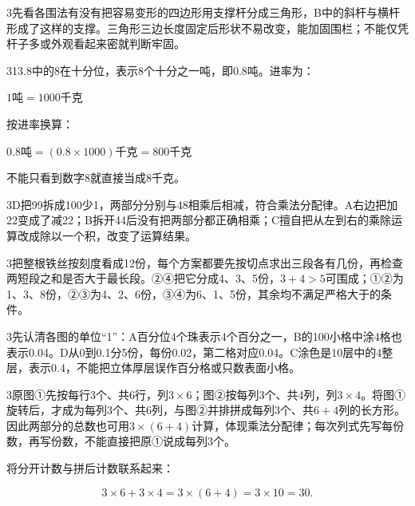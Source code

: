 \documentclass[multi=snippet,border={5bp 20bp 5bp 5bp}]{standalone}
\newenvironment{snippet}[3]{\begin{minipage}{#1bp}\color{answerred}\fontsize{#2}{#3}\selectfont\raggedright}{\end{minipage}}
\begin{document}
\begin{snippet}{505}{11.5}{14}\begin{multicols}{3}\raggedcolumns 先看各围法有没有把容易变形的四边形用支撑杆分成三角形，B中的斜杆与横杆形成了这样的支撑。三角形三边长度固定后形状不易改变，能加固围栏；不能仅凭杆子多或外观看起来密就判断牢固。\end{multicols}\end{snippet}
\begin{snippet}{505}{11.5}{14}\begin{multicols}{3}\raggedcolumns 13.8中的8在十分位，表示8个十分之一吨，即0.8吨。进率为：\par\noindent\(\displaystyle 1\text{吨}=1000\text{千克}\)\allowbreak \par 按进率换算：\par\noindent\(\displaystyle 0.8\text{吨}=(0.8\times1000)\text{千克}=800\text{千克}\)\allowbreak \par 不能只看到数字8就直接当成8千克。\end{multicols}\end{snippet}
\begin{snippet}{505}{11.5}{14}\begin{multicols}{3}\raggedcolumns D把99拆成100少1，两部分分别与48相乘后相减，符合乘法分配律。A右边把加22变成了减22；B拆开44后没有把两部分都正确相乘；C擅自把从左到右的乘除运算改成除以一个积，改变了运算结果。\end{multicols}\end{snippet}
\begin{snippet}{505}{11.5}{14}\begin{multicols}{3}\raggedcolumns 把整根铁丝按刻度看成12份，每个方案都要先按切点求出三段各有几份，再检查两短段之和是否大于最长段。②④把它分成4、3、5份，\(3+4>5\)\allowbreak 可围成；①②为1、3、8份，②③为4、2、6份，③④为6、1、5份，其余均不满足严格大于的条件。\end{multicols}\end{snippet}
\begin{snippet}{505}{11.5}{14}\begin{multicols}{3}\raggedcolumns 先认清各图的单位“1”：A百分位4个珠表示4个百分之一，B的100小格中涂4格也表示0.04。D从0到0.1分5份，每份0.02，第二格对应0.04。C涂色是10层中的4整层，表示0.4，不能把立体厚层误作百分格或只数表面小格。\end{multicols}\end{snippet}
\begin{snippet}{505}{11.5}{14}\begin{multicols}{3}\raggedcolumns 原图①先按每行3个、共6行，列\(3\times6\)\allowbreak ；图②按每列3个、共4列，列\(3\times4\)\allowbreak 。将图①旋转后，才成为每列3个、共6列，与图②并排拼成每列3个、共\(6+4\)\allowbreak 列的长方形。因此两部分的总数也可用\(3\times(6+4)\)\allowbreak 计算，体现乘法分配律；每次列式先写每份数，再写份数，不能直接把原①说成每列3个。\par 将分开计数与拼后计数联系起来：\end{multicols}\[3\times6+3\times4=3\times(6+4)=3\times10=30.\]\end{snippet}
\end{document}
